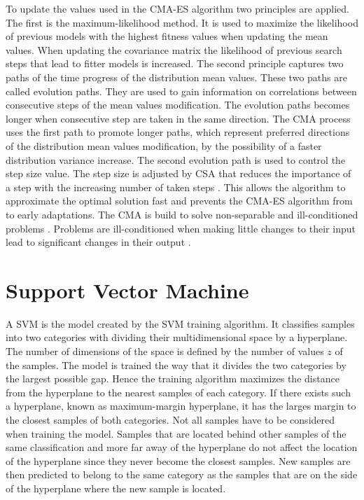 To update the values used in the \ac{CMA-ES} algorithm two principles are applied.
The first is the maximum-likelihood method.
It is used to maximize the likelihood of previous models with the highest fitness values when updating the mean values.
When updating the covariance matrix the likelihood of previous search steps that lead to fitter models is increased.
The second principle captures two paths of the time progress of the distribution mean values.
These two paths are called evolution paths.
They are used to gain information on correlations between consecutive steps of the mean values modification.
The evolution paths becomes longer when consecutive step are taken in the same direction.
The \ac{CMA} process uses the first path to promote longer paths, which represent preferred directions of the distribution mean values modification, by the possibility of a faster distribution variance increase.
The second evolution path is used to control the step size value.
The step size is adjusted by \ac{CSA} that reduces the importance of a step with the increasing number of taken steps \cite{Chotard2012CumulativeFunctions}.
This allows the algorithm to approximate the optimal solution fast and prevents the \ac{CMA-ES} algorithm from to early adaptations. 
The \ac{CMA} is build to solve non-separable and ill-conditioned problems \cite{Hansen2011TheTutorial}.
Problems are ill-conditioned when making little changes to their input lead to significant changes in their output \cite{2016ConditionNumber}.


\section{Support Vector Machine}
\label{sec:svm}

A \acf{SVM} is the model created by the \ac{SVM} training algorithm.
It classifies samples into two categories with dividing their multidimensional space by a hyperplane. %
The number of dimensions of the space is defined by the number of values $z$ of the samples.
The model is trained the way that it divides the two categories by the largest possible gap.
Hence the training algorithm maximizes the distance from the hyperplane to the nearest samples of each category.
If there exists such a hyperplane, known as maximum-margin hyperplane, it has the larges margin to the closest samples of both categories.
Not all samples have to be considered when training the model.
Samples that are located behind other samples of the same classification and more far away of the hyperplane do not affect the location of the hyperplane since they never become the closest samples.
New samples are then predicted to belong to the same category as the samples that are on the side of the hyperplane where the new sample is located.

